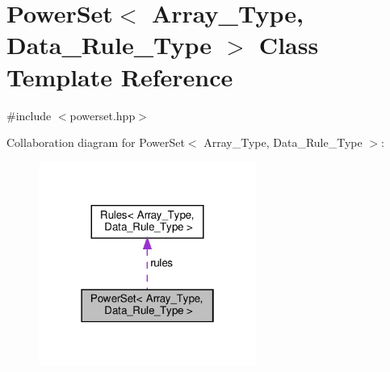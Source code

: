 \hypertarget{class_power_set}{}\section{Power\+Set$<$ Array\+\_\+\+Type, Data\+\_\+\+Rule\+\_\+\+Type $>$ Class Template Reference}
\label{class_power_set}


{\ttfamily \#include $<$powerset.\+hpp$>$}



Collaboration diagram for Power\+Set$<$ Array\+\_\+\+Type, Data\+\_\+\+Rule\+\_\+\+Type $>$\+:
\nopagebreak
\begin{figure}[H]
\begin{center}
\leavevmode
\includegraphics[width=202pt]{class_power_set__coll__graph}
\end{center}
\end{figure}
